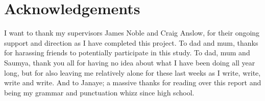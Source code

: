 \chapter*{Acknowledgements}\label{C:Acknowledge}

I want to thank my supervisors James Noble and Craig Anslow, for their ongoing support and direction as I have completed this project.
\newline
\newline
To dad and mum, thanks for harassing friends to potentially participate in this study. To dad, mum and Saumya, thank you all for having no idea about what I have been doing all year long, but for also leaving me relatively alone for these last weeks as I write, write, write and write. 
\newline
\newline
And to Janaye; a massive thanks for reading over this report and being my grammar and punctuation whizz since high school.